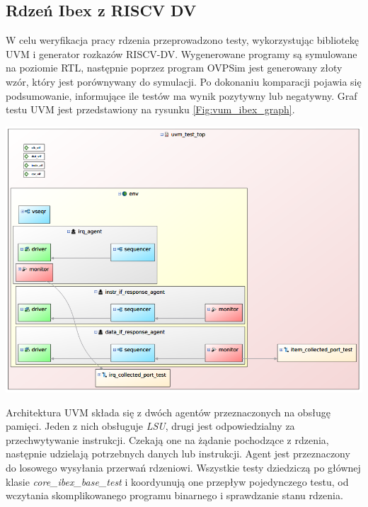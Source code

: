 \documentclass[11pt,a4paper]{article}
\begin{document}
	\subsection{Rdzeń Ibex z RISCV DV}
	W celu weryfikacja pracy rdzenia przeprowadzono testy, wykorzystując bibliotekę UVM i generator rozkazów RISCV-DV. Wygenerowane programy są symulowane na poziomie RTL, następnie poprzez program OVPSim jest generowany złoty wzór, który jest porównywany do symulacji. Po dokonaniu komparacji pojawia się podsumowanie, informujące ile testów ma wynik pozytywny lub negatywny. Graf testu UVM jest przedstawiony na rysunku \ref{Fig:vum_ibex_graph}.\\
	\begin{minipage}[c]{\textwidth}
	\begin{center}

					\includegraphics[width=\linewidth]{./rysunki/ibex_uvm.png}
	\end{center}	
	\end{minipage} 
	Architektura UVM składa się z dwóch agentów przeznaczonych na obsługę pamięci. Jeden z nich obsługuje \textit{LSU}, drugi jest odpowiedzialny za przechwytywanie instrukcji. Czekają one na żądanie pochodzące z rdzenia, następnie udzielają potrzebnych danych lub instrukcji. Agent jest przeznaczony do losowego wysyłania przerwań rdzeniowi. Wszystkie testy dziedziczą po głównej klasie \textit{core\_ibex\_base\_test} i koordyunują one przepływ pojedynczego testu, od wczytania skomplikowanego programu binarnego i sprawdzanie stanu rdzenia.\\
\end{document}
